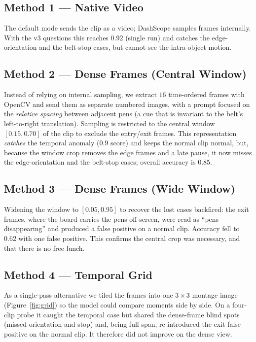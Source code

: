 \subsection{Method 1 --- Native Video}
The default mode sends the clip as a video; DashScope samples frames internally. With the
v3 questions this reaches $0.92$ (single run) and catches the edge-orientation and the
belt-stop cases, but cannot see the intra-object motion.

\subsection{Method 2 --- Dense Frames (Central Window)}
Instead of relying on internal sampling, we extract $16$ time-ordered frames with OpenCV
and send them as separate numbered images, with a prompt focused on the
\emph{relative spacing} between adjacent pens (a cue that is invariant to the belt's
left-to-right translation). Sampling is restricted to the central window $[0.15, 0.70]$
of the clip to exclude the entry/exit frames. This representation \emph{catches} the
temporal anomaly ($0.9$ score) and keeps the normal clip normal, but, because the window
crop removes the edge frames and a late pause, it now misses the edge-orientation and the
belt-stop cases; overall accuracy is $0.85$.

\subsection{Method 3 --- Dense Frames (Wide Window)}
Widening the window to $[0.05, 0.95]$ to recover the lost cases backfired: the exit
frames, where the board carries the pens off-screen, were read as ``pens disappearing''
and produced a false positive on a normal clip. Accuracy fell to $0.62$ with one false
positive. This confirms the central crop was necessary, and that there is no free lunch.

\subsection{Method 4 --- Temporal Grid}
As a single-pass alternative we tiled the frames into one $3\times3$ montage image
(Figure~\ref{fig:grid}) so the model could compare moments side by side. On a four-clip
probe it caught the temporal case but shared the dense-frame blind spots (missed
orientation and stop) and, being full-span, re-introduced the exit false positive on the
normal clip. It therefore did not improve on the dense view.

